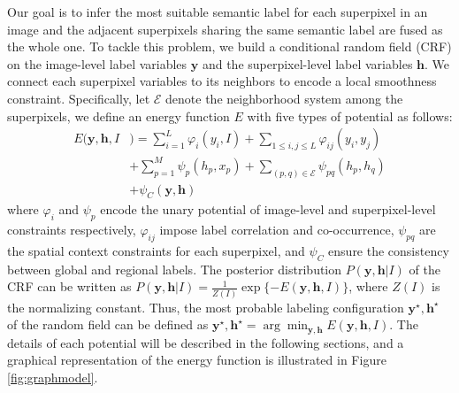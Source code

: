 Our goal is to infer the most suitable semantic label for each superpixel in an image and the adjacent superpixels sharing the same semantic label are fused as the whole one.
To tackle this problem, we build a conditional random field (CRF) on the image-level label variables $\boldsymbol{y}$ and the superpixel-level label variables $\boldsymbol{h}$.
We connect each superpixel variables to its neighbors to encode a local smoothness constraint.
Specifically, let $\mathcal{E}$ denote the neighborhood system among the superpixels, we define an energy function $E$ with five types of potential as follows:
\begin{equation}
    \label{eq:energyfunction}
    \begin{aligned}
        E(\boldsymbol{y},\boldsymbol{h},I&) = \sum_{i=1}^L{\varphi_{i}(y_i,I)}
                            + \sum_{1 \le i,j \le L} {\varphi_{ij}(y_i,y_j)}\\ &+ \sum_{p=1}^M{\psi_{p}(h_p,x_p)}+ \sum_{(p,q) \in \mathcal{E}}{\psi_{pq}(h_p,h_q)}\\ &+ \psi_{C}(\boldsymbol{y},\boldsymbol{h})
    \end{aligned}
\end{equation}
where $\varphi_{i}$ and $\psi_{p}$ encode the unary potential of image-level and superpixel-level constraints respectively, $\varphi_{ij}$ impose label correlation and co-occurrence, $\psi_{pq}$ are the spatial context constraints for each superpixel, and $\psi_C$ ensure the consistency between global and regional labels.
The posterior distribution $P(\boldsymbol{y},\boldsymbol{h}|I)$ of the CRF can be written as $P(\boldsymbol{y},\boldsymbol{h}|I) = \frac{1}{Z(I)}\exp{\{-E(\boldsymbol{y},\boldsymbol{h},I)\}}$, where $Z(I)$ is the normalizing constant.
Thus, the most probable labeling configuration $\boldsymbol{y}^{\star},\boldsymbol{h}^{\star}$ of the random field can be defined as  $\boldsymbol{y}^{\star},\boldsymbol{h}^{\star} = \arg \min_{\boldsymbol{y},\boldsymbol{h}} E(\boldsymbol{y},\boldsymbol{h},I)$.
The details of each potential will be described in the following sections, and a graphical representation of the energy function is illustrated in Figure \ref{fig:graphmodel}.



